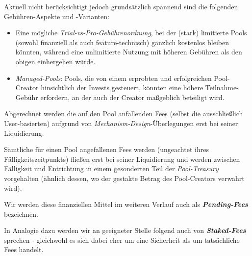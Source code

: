 \begin{Assumption}[Gebühren]
\vspace{0.5cm}	

Aktuell nicht berücksichtigt jedoch grundsätzlich spannend sind die folgenden Gebühren-Aspekte und -Varianten:

\begin{itemize}
	\item Eine mögliche \textit{Trial-vs-Pro-Gebührenordnung}, bei der (stark) limitierte Pools (sowohl finanziell als auch feature-technisch) gänzlich kostenlos bleiben könnten, während eine unlimitierte Nutzung mit höheren Gebühren als den obigen einhergehen würde.
	\item \textit{Managed-Pools}: Pools, die von einem erprobten und erfolgreichen Pool-Creator hinsichtlich der Invests gesteuert, könnten eine höhere Teilnahme-Gebühr erfordern, an der auch der Creator maßgeblich beteiligt wird. 
\end{itemize}	

\end{Assumption}

\vspace{0.5cm}

Abgerechnet werden die auf den Pool anfallenden Fees (selbst die ausschließlich User-basierten) aufgrund von \textit{Mechanism-Design}-Überlegungen erst bei seiner Liquidierung.

\vspace{0.3cm}

\begin{Praemisse}[Abrechnung]

Sämtliche für einen Pool angefallenen Fees werden (ungeachtet ihres Fälligkeitszeit\-punkts) fließen erst bei seiner Liquidierung und werden zwischen Fälligkeit und Entrichtung in einem gesonderten Teil der \textit{Pool-Treasury} vorgehalten (ähnlich dessen, wo der gestakte Betrag des Pool-Creators verwahrt wird).

\vspace{0.2cm}

Wir werden diese finanziellen Mittel im weiteren Verlauf auch als \textbf{\textit{Pending-Fees}} bezeichnen.

\vspace{0.2cm}

In Analogie dazu werden wir an geeigneter Stelle folgend auch von \textbf{\textit{Staked-Fees}} sprechen - gleichwohl es sich dabei eher um eine Sicherheit als um tatsächliche Fees handelt.

\end{Praemisse}

